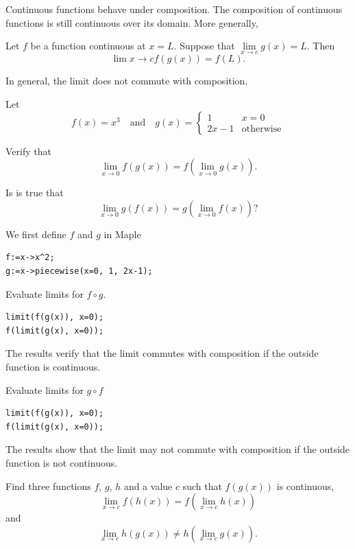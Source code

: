 \documentclass[en,11pt,simple]{elegantbook}
\let\BeginKnitrBlock\begin \let\EndKnitrBlock\end
\begin{document}
Continuous functions behave under composition. The composition of continuous functions is still continuous over its domain. More generally,

\BeginKnitrBlock{theorem}{}{}
\protect\hypertarget{thm:unnamed-chunk-36}{}{\label{thm:unnamed-chunk-36} }Let \(f\) be a function continuous at \(x=L\). Suppose that \(\lim\limits_{x\to c}g(x)=L\). Then
\[
\lim{x\to c}f(g(x))=f(L).
\]
\EndKnitrBlock{theorem}

In general, the limit does not commute with composition.

\BeginKnitrBlock{example}{}{}
\protect\hypertarget{exm:unnamed-chunk-37}{}{\label{exm:unnamed-chunk-37} }
Let
\[
f(x)=x^3\quad \text{and}\quad
g(x)=
\begin{cases}
1 & x=0\\
2x-1 & \text{otherwise}
\end{cases}
\]

Verify that
\[
\lim_{x\to 0}f(g(x))=f(\lim_{x\to 0}g(x)).
\]

Is is true that
\[
\lim_{x\to 0}g(f(x))=g(\lim_{x\to 0}f(x))?
\]
\EndKnitrBlock{example}

\BeginKnitrBlock{solution}{}{}
{}We first define \(f\) and \(g\) in Maple

\begin{verbatim}
f:=x->x^2;
g:=x->piecewise(x=0, 1, 2x-1);
\end{verbatim}

Evaluate limits for \(f\circ g\).

\begin{verbatim}
limit(f(g(x)), x=0);
f(limit(g(x), x=0));
\end{verbatim}

The results verify that the limit commutes with composition if the outside function is continuous.

Evaluate limits for \(g\circ f\)

\begin{verbatim}
limit(f(g(x)), x=0);
f(limit(g(x), x=0));
\end{verbatim}

The results show that the limit may not commute with composition if the outside function is not continuous.
\EndKnitrBlock{solution}

\BeginKnitrBlock{exercise}{}{}
\protect\hypertarget{exr:unnamed-chunk-39}{}{\label{exr:unnamed-chunk-39} }
Find three functions \(f\), \(g\), \(h\) and a value \(c\) such that \(f(g(x))\) is continuous,
\[
\lim\limits_{x\to c}f(h(x))=f(\lim\limits_{x\to c}h(x))
\]
and
\[
\lim\limits_{x\to c}h(g(x))\neq h(\lim\limits_{x\to c}g(x)).
\]
\EndKnitrBlock{exercise}
\end{document}
